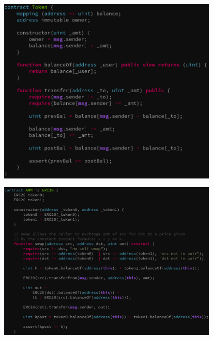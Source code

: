 \documentclass[aspectratio=169,10pt]{beamer}
\begin{document}
\begin{frame}[fragile]
\begin{center}
\begin{figure}
	\includegraphics[scale=0.3]{images/token_pass}
\end{figure}
\end{center}
\end{frame}

\begin{frame}[fragile]
\begin{center}
\begin{figure}
	\includegraphics[scale=0.25]{images/amm_fail}
\end{figure}
\end{center}
\end{frame}
\end{document}
